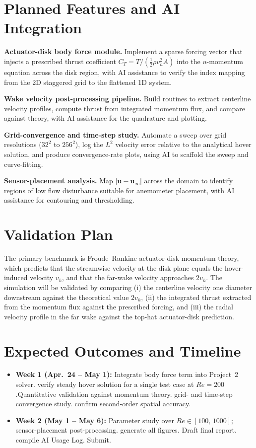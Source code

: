\documentclass[
  aapm,
  amsmath,amssymb,
  reprint,          %
  floatfix
]{revtex4-2}
\begin{document}
\section{Planned Features and AI Integration}

\textbf{Actuator-disk body force module.}
    Implement a sparse forcing vector that injects a prescribed thrust coefficient
    $C_T = T/(\tfrac{1}{2}\rho v_{h}^{2} A)$ into the $u$-momentum equation across
    the disk region, with AI assistance to verify the index mapping
    from the 2D staggered grid to the flattened 1D system.

\textbf{Wake velocity post-processing pipeline.}
    Build routines to extract centerline velocity profiles, compute thrust from
    integrated momentum flux, and compare against theory, with AI assistance for
    the quadrature and plotting.

\textbf{Grid-convergence and time-step study.}
    Automate a sweep over grid resolutions ($32^{2}$ to $256^{2}$), log the
    $L^{2}$ velocity error relative to the analytical hover solution, and produce
    convergence-rate plots, using AI to scaffold the sweep and curve-fitting.

\textbf{Sensor-placement analysis.}
    Map $|\mathbf{u} - \mathbf{u}_{\infty}|$ across the domain to identify
    regions of low flow disturbance suitable for anemometer placement, with
    AI assistance for contouring and thresholding.


\section{Validation Plan}

The primary benchmark is Froude--Rankine actuator-disk momentum theory, which predicts
that the streamwise velocity at the disk plane equals the hover-induced velocity
$v_{h}$, and that the far-wake velocity approaches $2v_{h}$.
The simulation will be validated by comparing (i) the centerline
velocity one diameter downstream against the theoretical value $2v_{h}$,
(ii) the integrated thrust extracted from the momentum flux against the prescribed
forcing, and (iii) the radial velocity profile in the far wake against the
top-hat actuator-disk prediction.

\section{Expected Outcomes and Timeline}

\begin{itemize}
  \item \textbf{Week 1 (Apr.\ 24 -- May 1):}
    Integrate body force term into Project~2 solver. verify steady hover solution
    for a single test case at $Re = 200$.Quantitative validation against momentum theory. grid- and time-step convergence
    study. confirm second-order spatial accuracy.
  \item \textbf{Week 2 (May 1 -- May 6):}
    Parameter study over $Re \in [100,\,1000]$; sensor-placement post-processing.
    generate all figures. Draft final report. compile AI Usage Log. Submit.
\end{itemize}




\end{document}
